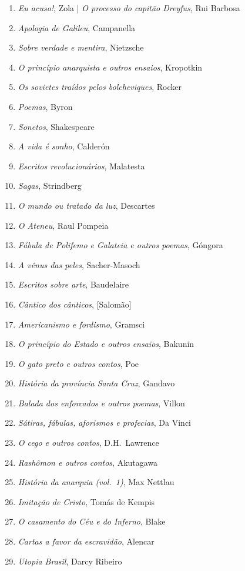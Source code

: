 \begin{enumerate}
\item \textit{Eu acuso!}, Zola | \textit{O processo do capitão Dreyfus}, Rui Barbosa
\item \textit{Apologia de Galileu}, Campanella 
\item \textit{Sobre verdade e mentira}, Nietzsche
\item \textit{O princípio anarquista e outros ensaios}, Kropotkin
\item \textit{Os sovietes traídos pelos bolcheviques}, Rocker
\item \textit{Poemas}, Byron
\item \textit{Sonetos}, Shakespeare
\item \textit{A vida é sonho}, Calderón
\item \textit{Escritos revolucionários}, Malatesta
\item \textit{Sagas}, Strindberg
\item \textit{O mundo ou tratado da luz}, Descartes
\item \textit{O Ateneu}, Raul Pompeia
\item \textit{Fábula de Polifemo e Galateia e outros poemas}, Góngora
\item \textit{A vênus das peles}, Sacher{}-Masoch
\item \textit{Escritos sobre arte}, Baudelaire
\item \textit{Cântico dos cânticos}, [Salomão]
\item \textit{Americanismo e fordismo}, Gramsci
\item \textit{O princípio do Estado e outros ensaios}, Bakunin
\item \textit{O gato preto e outros contos}, Poe
\item \textit{História da província Santa Cruz}, Gandavo
\item \textit{Balada dos enforcados e outros poemas}, Villon
\item \textit{Sátiras, fábulas, aforismos e profecias}, Da Vinci
\item \textit{O cego e outros contos}, D.H.~Lawrence
\item \textit{Rashômon e outros contos}, Akutagawa
\item \textit{História da anarquia (vol.~1)}, Max Nettlau
\item \textit{Imitação de Cristo}, Tomás de Kempis
\item \textit{O casamento do Céu e do Inferno}, Blake
\item \textit{Cartas a favor da escravidão}, Alencar
\item \textit{Utopia Brasil}, Darcy Ribeiro

\end{enumerate}
